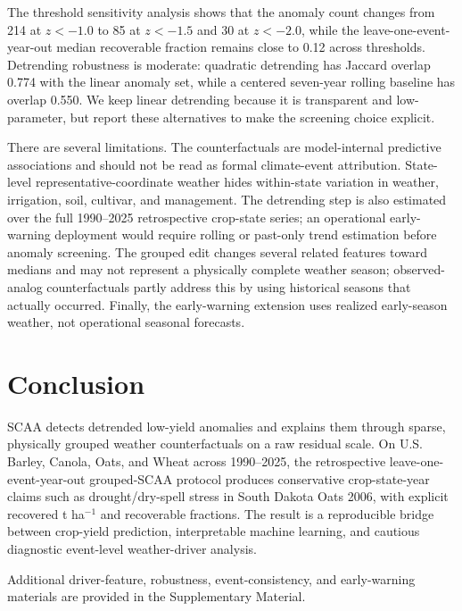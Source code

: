 \documentclass[11pt]{article}
\begin{document}
The threshold sensitivity analysis shows that the anomaly count changes from 214 at
$z<-1.0$ to 85 at $z<-1.5$ and 30 at $z<-2.0$, while the leave-one-event-year-out
median recoverable fraction remains close to 0.12 across thresholds. Detrending
robustness is moderate: quadratic detrending has Jaccard overlap 0.774 with the linear
anomaly set, while a centered seven-year rolling baseline has overlap 0.550. We keep
linear detrending because it is transparent and low-parameter, but report these
alternatives to make the screening choice explicit.

There are several limitations. The counterfactuals are model-internal predictive
associations and should not be read as formal climate-event attribution. State-level
representative-coordinate weather hides within-state variation in weather, irrigation,
soil, cultivar, and management. The detrending step is also estimated over the full
1990--2025 retrospective crop-state series; an operational early-warning deployment
would require rolling or past-only trend estimation before anomaly screening. The
grouped edit changes several related features toward medians and may not represent a
physically complete weather season; observed-analog counterfactuals partly address this
by using historical seasons that actually occurred. Finally, the early-warning extension
uses realized early-season weather, not operational seasonal forecasts.

\section{Conclusion}
SCAA detects detrended low-yield anomalies and explains them through sparse,
physically grouped weather counterfactuals on a raw residual scale. On U.S. Barley,
Canola, Oats, and Wheat across 1990--2025, the retrospective leave-one-event-year-out
grouped-SCAA protocol produces conservative crop-state-year claims such as
drought/dry-spell stress in South Dakota Oats 2006, with explicit recovered
t ha$^{-1}$ and recoverable fractions. The result is a reproducible bridge between
crop-yield prediction, interpretable machine learning, and cautious diagnostic
event-level weather-driver analysis.

Additional driver-feature, robustness, event-consistency, and early-warning materials
are provided in the Supplementary Material.



\end{document}
